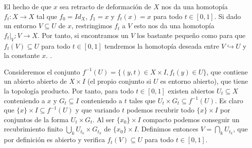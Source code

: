 \documentclass[twoside]{article}
\begin{document}
\begin{solucion}
El hecho de que $x$ sea retracto de deformación de $X$ nos da una homotopía $f_t:X\to X$ tal que $f_0=Id_X$, $f_1=x$ y $f_t(x)=x$ para todo $t\in[0,1]$. Si dado un entorno $V\subseteq U$ de $x$, restringimos $f_t$ a $V$ esto nos da una homotopía $f_t|_V: V\to X$. Por tanto, si encontramos un $V$ los bastante pequeño como para que $f_t(V)\subseteq U$ para todo $t\in [0,1]$ tendremos la homotopía deseada entre $V\hookrightarrow U$ y la constante $x$. . 

Consideremos el conjunto $f^{-1}(U)=\{(y,t)\in X\times I, f_t(y)\in U\}$, que contiene un abierto abierto de $X\times I$ (el propio conjunto si $U$ es entorno abierto), que tiene la topología producto. Por tanto, para todo $t\in [0,1]$ existen abiertos $U_t\subseteq X$ conteniendo a $x$ y $G_t\subseteq I$ conteniendo a $t$ tales que $U_t\times G_t\subseteq f^{-1}(U)$. Es claro que $\{x\}\times I\subseteq f^{-1}(U)$ y que variando $t$ podemos recubrir todo $\{x\}\times I$ por conjuntos de la forma $U_t\times G_t$. Al ser $\{x_0\}\times I$ compacto podemos conseguir un recubrimiento finito $\bigcup_k U_{t_k}\times G_{t_k}$ de $\{x_0\}\times I$. Definimos entonces $V=\bigcap_k U_{t_k}$, que por definición es abierto y verifica $f_t(V)\subseteq U$ para todo $t\in [0,1]$. 


\end{solucion}
\end{document}
